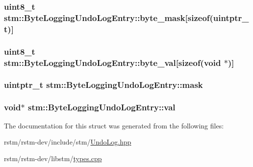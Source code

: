 \hypertarget{structstm_1_1ByteLoggingUndoLogEntry_aaf3fc6fb3291d9acd7a879e0a5deff75}{
\subsubsection[{byte\-\_\-mask}]{\setlength{\rightskip}{0pt plus 5cm}uint8\-\_\-t stm\-::\-Byte\-Logging\-Undo\-Log\-Entry\-::byte\-\_\-mask\mbox{[}sizeof(uintptr\-\_\-t)\mbox{]}}}\label{structstm_1_1ByteLoggingUndoLogEntry_aaf3fc6fb3291d9acd7a879e0a5deff75}
\hypertarget{structstm_1_1ByteLoggingUndoLogEntry_aea8c8f8cbb3a681a7199d8b55eb37593}{
\subsubsection[{byte\-\_\-val}]{\setlength{\rightskip}{0pt plus 5cm}uint8\-\_\-t stm\-::\-Byte\-Logging\-Undo\-Log\-Entry\-::byte\-\_\-val\mbox{[}sizeof(void $\ast$)\mbox{]}}}\label{structstm_1_1ByteLoggingUndoLogEntry_aea8c8f8cbb3a681a7199d8b55eb37593}
\hypertarget{structstm_1_1ByteLoggingUndoLogEntry_a20d84801f239a2fe816d0cb64360b914}{
\subsubsection[{mask}]{\setlength{\rightskip}{0pt plus 5cm}uintptr\-\_\-t stm\-::\-Byte\-Logging\-Undo\-Log\-Entry\-::mask}}\label{structstm_1_1ByteLoggingUndoLogEntry_a20d84801f239a2fe816d0cb64360b914}
\hypertarget{structstm_1_1ByteLoggingUndoLogEntry_a04ff02f94131a3ed589024795c13f28a}{
\subsubsection[{val}]{\setlength{\rightskip}{0pt plus 5cm}void$\ast$ stm\-::\-Byte\-Logging\-Undo\-Log\-Entry\-::val}}\label{structstm_1_1ByteLoggingUndoLogEntry_a04ff02f94131a3ed589024795c13f28a}


The documentation for this struct was generated from the following files\-:\begin{DoxyCompactItemize}
\item 
rstm/rstm-\/dev/include/stm/\hyperlink{UndoLog_8hpp}{Undo\-Log.\-hpp}\item 
rstm/rstm-\/dev/libstm/\hyperlink{types_8cpp}{types.\-cpp}\end{DoxyCompactItemize}
